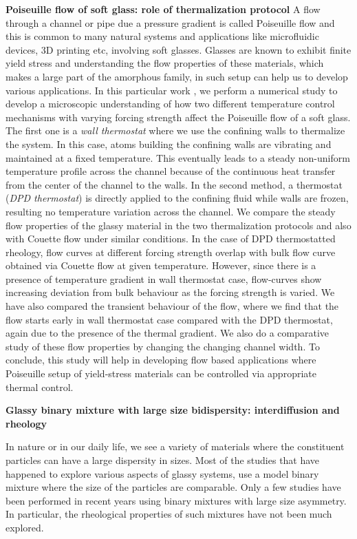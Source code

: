 \vskip 1.0cm
{\bf {\large Poiseuille flow of soft glass: role of thermalization protocol}}
\vskip 0.2cm
A flow through a channel or pipe due a pressure gradient is called Poiseuille flow and this is common to many natural systems and applications like microfluidic devices, 3D printing etc, involving soft glasses. Glasses are known to exhibit finite yield stress and understanding the flow properties of these materials, which makes a large part of the amorphous family, in such setup can help us to develop various applications. In this particular work \cite{vaibhav2021influence}, we perform a numerical study to develop a microscopic understanding of how two different temperature control mechanisms with varying forcing strength affect the Poiseuille flow of a soft glass. The first one is a \textit{wall thermostat} where we use the confining walls to thermalize the system. In this case, atoms building the confining walls are vibrating and maintained at a fixed temperature. This eventually leads to a steady non-uniform temperature profile across the channel because of the continuous heat transfer from the center of the channel to the walls. In the second method, a thermostat (\textit{DPD thermostat}) is directly applied to the confining fluid while walls are frozen, resulting no temperature variation across the channel. We compare the steady flow properties of the glassy material in the two thermalization protocols and also with Couette flow under similar conditions. In the case of DPD thermostatted rheology, flow curves at different forcing strength overlap with bulk flow curve obtained via Couette flow at given temperature. However, since there is a presence of temperature gradient in wall thermostat case, flow-curves show increasing deviation from bulk behaviour as the forcing strength is varied. We have also compared the transient behaviour of the flow, where we find that the flow starts early in wall thermostat case compared with the DPD thermostat, again due to the presence of the thermal gradient. We also do a comparative study of these flow properties by changing the changing channel width. To conclude, this study will help in developing flow based applications where Poiseuille setup of yield-stress materials can be controlled via appropriate thermal control.

\vskip 1.0cm
{\bf {\large Glassy binary mixture with large size bidispersity: interdiffusion and rheology}}
\vskip 0.5cm

In nature or in our daily life, we see a variety of materials where the constituent particles can have a large dispersity in sizes. Most of the studies that have happened to explore various aspects of glassy systems, use a model binary mixture where the size of the particles are comparable. Only a few studies have been performed in recent years using binary mixtures with large size asymmetry. In particular, the rheological properties of such mixtures have not been much explored. 

